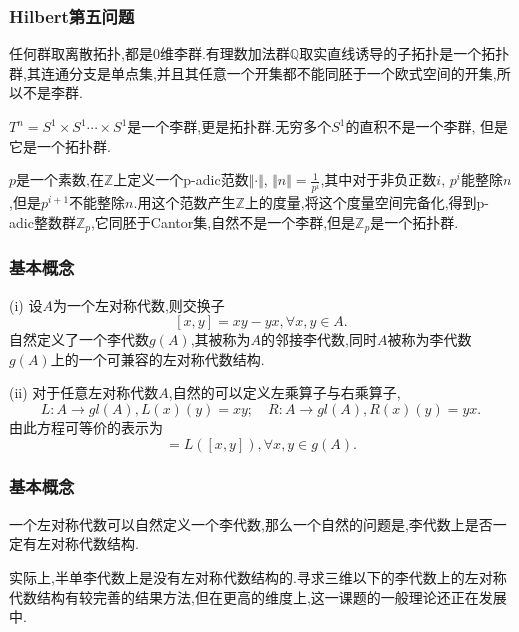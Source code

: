 \documentclass[aspectratio=169, 10pt, utf8, mathserif]{beamer}
\begin{document}
\begin{frame}[plain]
	\frametitle{Hilbert第五问题}
	\begin{example}
		任何群取离散拓扑,都是$0$维李群.有理数加法群$\mathbb{Q}$取实直线诱导的子拓扑是一个拓扑群,其连通分支是单点集,并且其任意一个开集都不能同胚于一个欧式空间的开集,所以不是李群.
	\end{example}
	\begin{example}
		$T^n=S^1\times S^1\cdots \times S^1$是一个李群,更是拓扑群.无穷多个$S^1$的直积不是一个李群, 但是它是一个拓扑群.
	\end{example}
	\begin{example}
		$p$是一个素数,在$\mathbb{Z}$上定义一个p-adic范数$\Vert\cdot\Vert$, $\Vert n\Vert=\frac{1}{p^i}$,其中对于非负正数$i$, $p^i$能整除$n$,但是$p^{i+1}$不能整除$n$.用这个范数产生$\mathbb{Z}$上的度量,将这个度量空间完备化,得到p-adic整数群$\mathbb{Z}_p$,它同胚于Cantor集,自然不是一个李群,但是$\mathbb{Z}_p$是一个拓扑群.
	\end{example}
\end{frame}


\begin{frame}[plain]
	\frametitle{基本概念}

\begin{Theorem}
(i) 设$A$为一个左对称代数,则交换子\[[x,y]=xy-yx, \forall x,y\in A.\]
自然定义了一个李代数$g(A)$,其被称为$A$的邻接李代数,同时$A$被称为李代数$g(A)$上的一个可兼容的左对称代数结构.

(ii) 对于任意左对称代数$A$,自然的可以定义左乘算子与右乘算子,\[L:A\rightarrow gl(A), L(x)(y)=xy;\quad R:A\rightarrow gl(A), R(x)(y)=yx.\]
由此方程可等价的表示为
\begin{equation}
[L(x),L(y)]=L([x,y]), \forall x,y\in g(A).
\end{equation}
\end{Theorem}
\end{frame}

\begin{frame}
	\frametitle{基本概念}
一个左对称代数可以自然定义一个李代数,那么一个自然的问题是,李代数上是否一定有左对称代数结构.

实际上,半单李代数上是没有左对称代数结构的.寻求三维以下的李代数上的左对称代数结构有较完善的结果方法,但在更高的维度上,这一课题的一般理论还正在发展中.

\end{frame}
\end{document}
